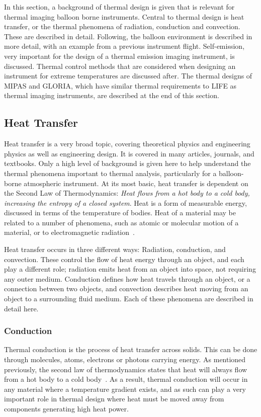 In this section, a background of thermal design is given that is relevant for thermal imaging balloon borne instruments. Central to thermal design is heat transfer, or the thermal phenomena of radiation, conduction and convection. These are described in detail. Following, the balloon environment is described in more detail, with an example from a previous instrument flight. Self-emission, very important for the design of a thermal emission imaging instrument, is discussed. Thermal control methods that are considered when designing an instrument for extreme temperatures are discussed after. The thermal designs of MIPAS and GLORIA, which have similar thermal requirements to LIFE as thermal imaging instruments, are described at the end of this section.

\subsection{Heat Transfer}\label{heat_transfer}
Heat transfer is a very broad topic, covering theoretical physics and engineering physics as well as engineering design. It is covered in many articles, journals, and textbooks. Only a high level of background is given here to help understand the thermal phenomena important to thermal analysis, particularly for a balloon-borne atmospheric instrument. At its most basic, heat transfer is dependent on the Second Law of Thermodynamics: \textit{Heat flows from a hot body to a cold body, increasing the entropy of a closed system}. Heat is a form of measurable energy, discussed in terms of the temperature of bodies. Heat of a material may be related to a number of phenomena, such as atomic or molecular motion of a material, or to electromagnetic radiation~\citep{Heat_Transfer_telescope}.

Heat transfer occurs in three different ways: Radiation, conduction, and convection. These control the flow of heat energy through an object, and each play a different role; radiation emits heat from an object into space, not requiring any outer medium. Conduction defines how heat travels through an object, or a connection between two objects, and convection describes heat moving from an object to a surrounding fluid medium. Each of these phenomena are described in detail here.

\subsubsection{Conduction}\label{Conduction_sec}
Thermal conduction is the process of heat transfer across solids. This can be done through molecules, atoms, electrons or photons carrying energy. As mentioned previously, the second law of thermodynamics states that heat will always flow from a hot body to a cold body~\citep{Heat_Transfer_Basics}. As a result, thermal conduction will occur in any material where a temperature gradient exists, and as such can play a very important role in thermal design where heat must be moved away from components generating high heat power.

